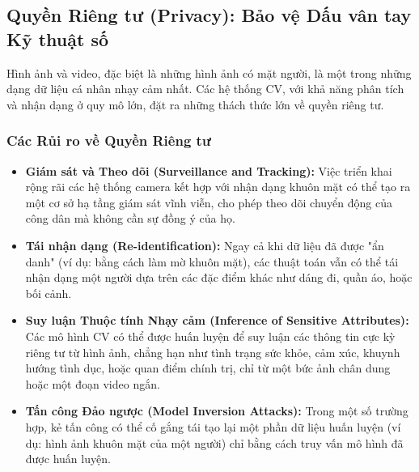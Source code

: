 \subsection{Quyền Riêng tư (Privacy): Bảo vệ Dấu vân tay Kỹ thuật số}
\label{subsec:privacy}

Hình ảnh và video, đặc biệt là những hình ảnh có mặt người, là một trong những dạng dữ liệu cá nhân nhạy cảm nhất. Các hệ thống CV, với khả năng phân tích và nhận dạng ở quy mô lớn, đặt ra những thách thức lớn về quyền riêng tư.

\subsubsection{Các Rủi ro về Quyền Riêng tư}
\label{subsubsec:privacy_risks}
\begin{itemize}
    \item \textbf{Giám sát và Theo dõi (Surveillance and Tracking):} Việc triển khai rộng rãi các hệ thống camera kết hợp với nhận dạng khuôn mặt có thể tạo ra một cơ sở hạ tầng giám sát vĩnh viễn, cho phép theo dõi chuyển động của công dân mà không cần sự đồng ý của họ.
    \item \textbf{Tái nhận dạng (Re-identification):} Ngay cả khi dữ liệu đã được "ẩn danh" (ví dụ: bằng cách làm mờ khuôn mặt), các thuật toán vẫn có thể tái nhận dạng một người dựa trên các đặc điểm khác như dáng đi, quần áo, hoặc bối cảnh.
    \item \textbf{Suy luận Thuộc tính Nhạy cảm (Inference of Sensitive Attributes):} Các mô hình CV có thể được huấn luyện để suy luận các thông tin cực kỳ riêng tư từ hình ảnh, chẳng hạn như tình trạng sức khỏe, cảm xúc, khuynh hướng tình dục, hoặc quan điểm chính trị, chỉ từ một bức ảnh chân dung hoặc một đoạn video ngắn.
    \item \textbf{Tấn công Đảo ngược (Model Inversion Attacks):} Trong một số trường hợp, kẻ tấn công có thể cố gắng tái tạo lại một phần dữ liệu huấn luyện (ví dụ: hình ảnh khuôn mặt của một người) chỉ bằng cách truy vấn mô hình đã được huấn luyện.
\end{itemize}

